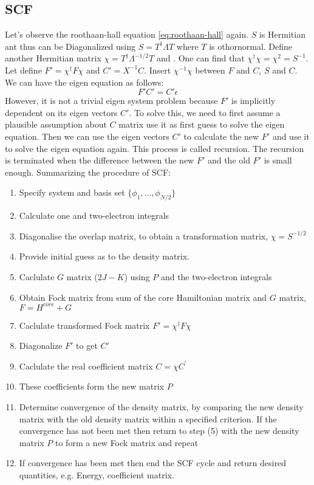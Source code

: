 \documentclass[11pt]{article}
\begin{document}
\subsection{SCF}\label{s:scf-procedure}
Let's observe the roothaan-hall equation \ref{eq:roothaan-hall} again. $S$ is Hermitian ant thus can be Diagonalized using $S=T^{\dag} \Lambda T$ where $T$ is othornormal. Define another Hermitian matrix $ \chi = T^{\dag}\Lambda^{-1/2} T$ and . One can find that $\chi^{\dag}\chi = \chi^2 = S^{-1}$. Let define $F' = \chi^{\dag} F \chi$ and $C'=X^{-1}C$. Insert $\chi^{-1}\chi$ between $F$ and $C$, $S$ and $C$. We can have the eigen equation as follows:
\begin{equation}
    F' C' = C' \epsilon
\end{equation} 
However, it is not a trivial eigen system problem because $F'$ is implicitly dependent on its eigen vectors $C'$. To solve this, we need to first assume a plausible assumption about $C$ matrix use it as first guess to solve the eigen equation. Then we can use the eigen vectors $C'$ to calculate the new $F'$ and use it to solve the eigen equation again. This process is called recursion. The recursion is terminated when the difference between the new $F'$ and the old $F'$ is small enough. Summarizing the procedure of SCF:
\begin{enumerate}
    \item Specify system and basis set $\{\phi_1, ...,\phi_{N/2}\}$
    \item Calculate one and two-electron integrals
    \item Diagonalise the overlap matrix, to obtain a transformation matrix, $\chi = S^{-1/2}$
    \item Provide initial guess as to the density matrix. 
    \item Caclulate $G$ matrix ($2J-K$)  using $P$ and the two-electron integrals
    \item Obtain Fock matrix from sum of the core Hamiltonian matrix and  $G$ matrix, $F=H^{core} + G$
    \item Caclulate transformed Fock matrix $F'=\chi^{\dag} F \chi$
    \item Diagonalize $F'$ to get $C'$
    \item Caclulate the real coefficient matrix $C=\chi C^{'}$
    \item These coefficients form the new matrix $P$
    \item Determine convergence of the density matrix, by comparing the new density matrix with the old density matrix within a specified criterion. If the convergence has not been met then return to step (5) with the new density matrix $P$ to form a new Fock matrix and repeat
    \item If convergence has been met then end the SCF cycle and return desired quantities, e.g. Energy, coefficient matrix.
\end{enumerate}
\end{document}
